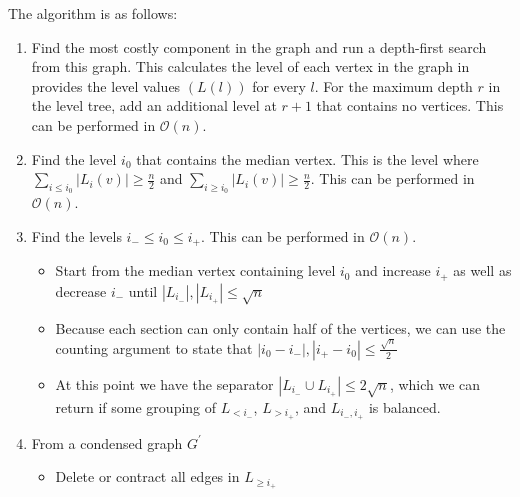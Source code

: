 \documentclass[12pt]{article}
\begin{document}
    The algorithm is as follows:
    \begin{enumerate}



        \item Find the most costly component in the graph and run a depth-first search from this graph. This calculates the level of each vertex in the graph in provides the level values $(L(l))$ for every $l$. For the maximum depth $r$ in the level tree, add an additional level at $r+1$ that contains no vertices. This can be performed in $\mathcal{O}(n)$.

        \item Find the level $i_0$ that contains the median vertex. This is the level where $\sum_{i \leq i_0} |L_i(v)| \geq \frac{n}{2}$ and $\sum_{i \geq i_0} |L_i(v)| \geq \frac{n}{2}$. This can be performed in $\mathcal{O}(n)$.

        \item Find the levels $i_- \leq i_0 \leq i_+$. This can be performed in $\mathcal{O}(n)$.
        \begin{itemize}
            \item Start from the median vertex containing level $i_0$ and increase $i_+$ as well as decrease $i_-$ until $|L_{i_-}|,|L_{i_+}| \leq \sqrt{n}$

            \item Because each section can only contain half of the vertices, we can use the counting argument to state that $|i_0 - i_-|,|i_+ - i_0| \leq \frac{\sqrt{n}}{2}$

            \item At this point we have the separator $|L_{i_-} \cup L_{i_+}| \leq 2 \sqrt{n}$, which we can return if some grouping of $L_{< i_-}$, $L_{> i_+}$, and $L_{i_-,i_+}$ is balanced.
        \end{itemize}

        \item From a condensed graph $G^{'}$
        \begin{itemize}
            \item Delete or contract all edges in $L_{\geq i_+}$


\end{itemize}
\end{enumerate}
\end{document}
